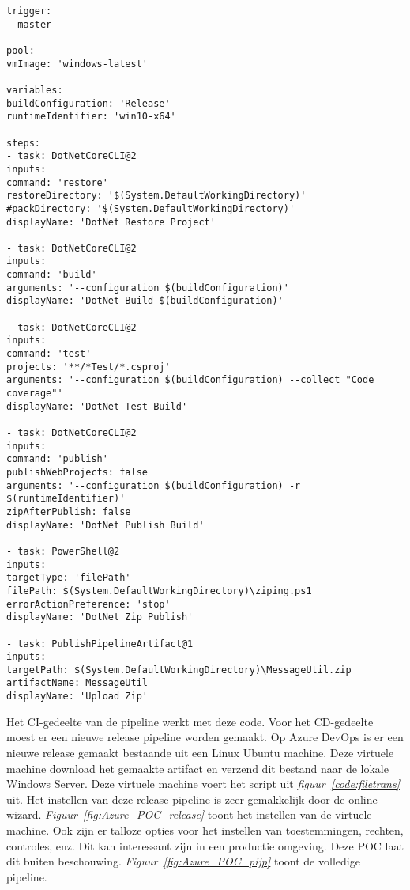 \begin{lstlisting}
trigger:
- master

pool:
vmImage: 'windows-latest'

variables:
buildConfiguration: 'Release'
runtimeIdentifier: 'win10-x64'

steps:
- task: DotNetCoreCLI@2
inputs:
command: 'restore'
restoreDirectory: '$(System.DefaultWorkingDirectory)'
#packDirectory: '$(System.DefaultWorkingDirectory)'
displayName: 'DotNet Restore Project'

- task: DotNetCoreCLI@2
inputs:
command: 'build'
arguments: '--configuration $(buildConfiguration)'
displayName: 'DotNet Build $(buildConfiguration)'

- task: DotNetCoreCLI@2
inputs:
command: 'test'
projects: '**/*Test/*.csproj'
arguments: '--configuration $(buildConfiguration) --collect "Code coverage"'
displayName: 'DotNet Test Build'

- task: DotNetCoreCLI@2
inputs:
command: 'publish'
publishWebProjects: false
arguments: '--configuration $(buildConfiguration) -r $(runtimeIdentifier)'
zipAfterPublish: false
displayName: 'DotNet Publish Build'

- task: PowerShell@2
inputs:
targetType: 'filePath'
filePath: $(System.DefaultWorkingDirectory)\ziping.ps1
errorActionPreference: 'stop'
displayName: 'DotNet Zip Publish'

- task: PublishPipelineArtifact@1
inputs:
targetPath: $(System.DefaultWorkingDirectory)\MessageUtil.zip
artifactName: MessageUtil
displayName: 'Upload Zip'
\end{lstlisting}

Het CI-gedeelte van de pipeline werkt met deze code. Voor het CD-gedeelte moest er een nieuwe release pipeline worden gemaakt. Op Azure DevOps is er een nieuwe release gemaakt bestaande uit een Linux Ubuntu machine. Deze virtuele machine download het gemaakte artifact en verzend dit bestand naar de lokale Windows Server. Deze virtuele machine voert het script uit \emph{figuur~\ref{code:filetrans}} uit. Het instellen van deze release pipeline is zeer gemakkelijk door de online wizard. \emph{Figuur~\ref{fig:Azure_POC_release}} toont het instellen van de virtuele machine. Ook zijn er talloze opties voor het instellen van toestemmingen, rechten, controles, enz. Dit kan interessant zijn in een productie omgeving. Deze POC laat dit buiten beschouwing. \emph{Figuur~\ref{fig:Azure_POC_pijp}} toont de volledige pipeline.

